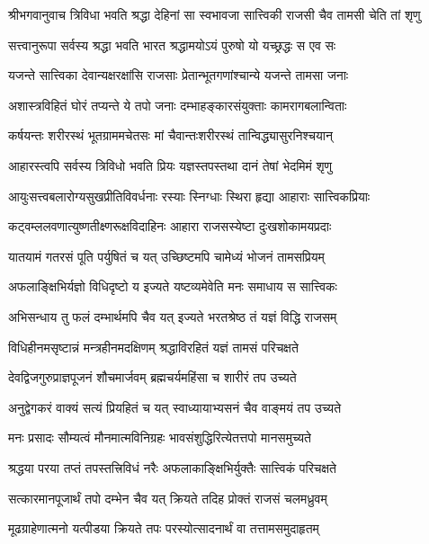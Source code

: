 {श्रीभगवानुवाच}
\twolineshloka
{त्रिविधा भवति श्रद्धा देहिनां सा स्वभावजा}
{सात्त्विकी राजसी चैव तामसी चेति तां शृणु}%

\twolineshloka
{सत्त्वानुरूपा सर्वस्य श्रद्धा भवति भारत}
{श्रद्धामयोऽयं पुरुषो यो यच्छ्रद्धः स एव सः}%

\twolineshloka
{यजन्ते सात्त्विका देवान्यक्षरक्षांसि राजसाः}
{प्रेतान्भूतगणांश्चान्ये यजन्ते तामसा जनाः}%

\twolineshloka
{अशास्त्रविहितं घोरं तप्यन्ते ये तपो जनाः}
{दम्भाहङ्कारसंयुक्ताः कामरागबलान्विताः}%

\twolineshloka
{कर्षयन्तः शरीरस्थं भूतग्राममचेतसः}
{मां चैवान्तःशरीरस्थं तान्विद्ध्यासुरनिश्चयान्}%

\twolineshloka
{आहारस्त्वपि सर्वस्य त्रिविधो भवति प्रियः}
{यज्ञस्तपस्तथा दानं तेषां भेदमिमं शृणु}%

\twolineshloka
{आयुःसत्त्वबलारोग्यसुखप्रीतिविवर्धनाः}
{रस्याः स्निग्धाः स्थिरा हृद्या आहाराः सात्त्विकप्रियाः}%

\twolineshloka
{कट्वम्ललवणात्युष्णतीक्ष्णरूक्षविदाहिनः}
{आहारा राजसस्येष्टा दुःखशोकामयप्रदाः}%

\twolineshloka
{यातयामं गतरसं पूति पर्युषितं च यत्}
{उच्छिष्टमपि चामेध्यं भोजनं तामसप्रियम्}%

\twolineshloka
{अफलाङ्क्षिभिर्यज्ञो विधिदृष्टो य इज्यते}
{यष्टव्यमेवेति मनः समाधाय स सात्त्विकः}%

\twolineshloka
{अभिसन्धाय तु फलं दम्भार्थमपि चैव यत्}
{इज्यते भरतश्रेष्ठ तं यज्ञं विद्धि राजसम्}%

\twolineshloka
{विधिहीनमसृष्टान्नं मन्त्रहीनमदक्षिणम्}
{श्रद्धाविरहितं यज्ञं तामसं परिचक्षते}%

\twolineshloka
{देवद्विजगुरुप्राज्ञपूजनं शौचमार्जवम्}
{ब्रह्मचर्यमहिंसा च शारीरं तप उच्यते}%

\twolineshloka
{अनुद्वेगकरं वाक्यं सत्यं प्रियहितं च यत्}
{स्वाध्यायाभ्यसनं चैव वाङ्मयं तप उच्यते}%

\twolineshloka
{मनः प्रसादः सौम्यत्वं मौनमात्मविनिग्रहः}
{भावसंशुद्धिरित्येतत्तपो मानसमुच्यते}%

\twolineshloka
{श्रद्धया परया तप्तं तपस्तत्त्रिविधं नरैः}
{अफलाकाङ्क्षिभिर्युक्तैः सात्त्विकं परिचक्षते}%

\twolineshloka
{सत्कारमानपूजार्थं तपो दम्भेन चैव यत्}
{क्रियते तदिह प्रोक्तं राजसं चलमध्रुवम्}%

\twolineshloka
{मूढग्राहेणात्मनो यत्पीडया क्रियते तपः}
{परस्योत्सादनार्थं वा तत्तामसमुदाहृतम्}%

